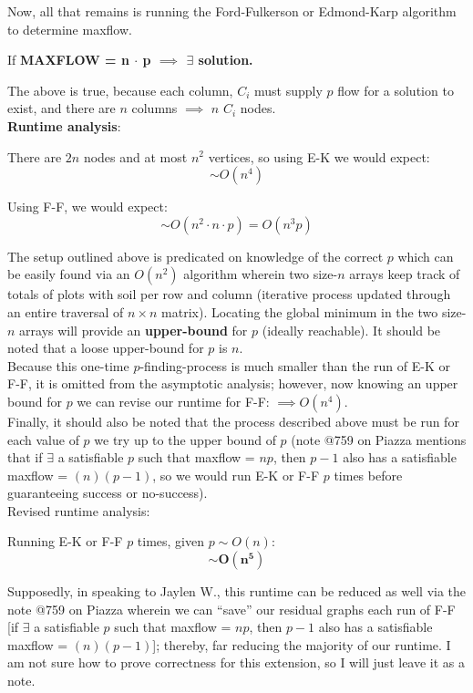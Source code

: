 \documentclass[conference]{styles/acmsiggraph}
\newcommand{\?}{\stackrel{?}{=}}
\DeclareRobustCommand{\mybox}[2][gray!20]{%
\begin{tcolorbox}[   %
        breakable,
        left=0pt,
        right=0pt,
        top=0pt,
        bottom=0pt,
        colback=#1,
        colframe=#1,
        width=\dimexpr\textwidth\relax, 
        enlarge left by=0mm,
        boxsep=5pt,
        arc=0pt,outer arc=0pt,
        ]
        #2
\end{tcolorbox}
}
\begin{document}
Now, all that remains is running the Ford-Fulkerson or Edmond-Karp algorithm to determine maxflow.

\mybox{\centering If \textbf{MAXFLOW = n $\cdot$ p $\implies$ $\exists$ solution.}}

The above is true, because each column, $C_i$ must supply $p$ flow for a solution to exist, and there are $n$ columns $\implies$ $n$ $C_i$ nodes. \\

\textbf{Runtime analysis}:
\mybox{There are $2n$ nodes and at most $n^2$ vertices, so using E-K we would expect:
$$\sim O(n^4)$$

Using F-F, we would expect:
$$\sim O(n^2 \cdot n \cdot p) = O(n^3p)$$
}

The setup outlined above is predicated on knowledge of the correct $p$ which can be easily found via an $O(n^2)$ algorithm wherein two size-$n$ arrays keep track of totals of plots with soil per row and column (iterative process updated through an entire traversal of $n \times n$ matrix).  Locating the global minimum in the two size-$n$ arrays will provide an \textbf{upper-bound} for $p$ (ideally reachable).  It should be noted that a loose upper-bound for $p$ is $n$.\\

Because this one-time $p$-finding-process is much smaller than the run of E-K or F-F, it is omitted from the asymptotic analysis; however, now knowing an upper bound for $p$ we can revise our runtime for F-F: $\implies O(n^4)$.\\

Finally, it should also be noted that the process described above must be run for each value of $p$ we try up to the upper bound of $p$ (note @759 on Piazza mentions that if $\exists$ a satisfiable $p$ such that maxflow = $np$, then $p-1$ also has a satisfiable maxflow = $(n)(p-1)$, so we would run E-K or F-F $p$ times before guaranteeing success or no-success). \\

Revised runtime analysis:
\mybox{
Running E-K or F-F $p$ times, given $p \sim O(n)$:
$$\mathbf{\sim O(n^5)}$$ 
}
Supposedly, in speaking to Jaylen W., this runtime can be reduced as well via the note @759 on Piazza wherein we can \enquote{save} our residual graphs each run of F-F [if $\exists$ a satisfiable $p$ such that maxflow = $np$, then $p-1$ also has a satisfiable maxflow = $(n)(p-1)$]; thereby, far reducing the majority of our runtime.  I am not sure how to prove correctness for this extension, so I will just leave it as a note.
\end{document}
